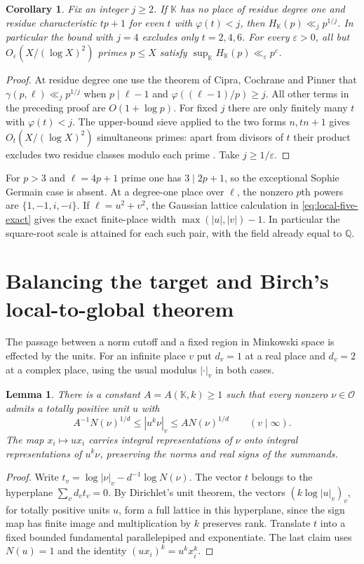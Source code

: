 \documentclass[11pt,letterpaper]{article}
\newtheorem{lemma}[lemma]{Lemma}
\newtheorem{corollary}[corollary]{Corollary}
\theoremstyle{definition}
\numberwithin{equation}{section}
\begin{document}
\begin{corollary}\label{cor:prime-degree-density}
Fix an integer $j\ge2$. If $\mathbb K$ has no place of residue degree one and
residue characteristic $tp+1$ for even $t$ with $\varphi(t)<j$,
then $H_{\mathbb K}(p)\ll_j p^{1/j}$. In particular the bound
with $j=4$ excludes only $t=2,4,6$. For every $\varepsilon>0$,
all but $O_\varepsilon(X/(\log X)^2)$ primes $p\le X$ satisfy
$\sup_{\mathbb K}H_{\mathbb K}(p)\ll_\varepsilon p^\varepsilon$.
\end{corollary}
\begin{proof}
At residue degree one use the theorem of Cipra, Cochrane and
Pinner \cite[Theorem~1]{hprimeCCP} that
$\gamma(p,\ell)\ll_j p^{1/j}$ when $p\mid\ell-1$ and
$\varphi((\ell-1)/p)\ge j$. All other terms in the preceding proof
are $O(1+\log p)$. For fixed $j$ there are only finitely many $t$
with $\varphi(t)<j$. The upper-bound sieve applied to the two forms
$n,tn+1$ gives $O_t(X/(\log X)^2)$ simultaneous primes:
apart from divisors of $t$ their product excludes two residue
classes modulo each prime \cite{hprimeHR}. Take $j\ge1/\varepsilon$.
\end{proof}
For $p>3$ and $\ell=4p+1$ prime one has $3\mid2p+1$, so the
exceptional Sophie Germain case is absent. At a degree-one place
over $\ell$, the nonzero $p$th powers are $\{1,-1,i,-i\}$.
If $\ell=u^2+v^2$, the Gaussian lattice calculation in
\eqref{eq:local-five-exact} gives the exact finite-place width
$\max(|u|,|v|)-1$. In particular the square-root scale is attained
for each such pair, with the field already equal to $\mathbb Q$.

\section{Balancing the target and Birch's local-to-global theorem}\label{sec:hbirch}
The passage between a norm cutoff and a fixed region in Minkowski
space is effected by the units. For an infinite place $v$ put $d_v=1$
at a real place and $d_v=2$ at a complex place, using the usual modulus
$|\cdot|_v$ in both cases.

\begin{lemma}\label{lem:hbal}
There is a constant $A=A(\mathbb K,k)\ge1$ such that every nonzero
$\nu\in\mathcal O$ admits a totally positive unit $u$ with
\[
 A^{-1}N(\nu)^{1/d}\le |u^k\nu|_v\le A N(\nu)^{1/d}
                  \qquad(v\mid\infty).
\]
The map $x_i\mapsto ux_i$ carries integral representations of $\nu$
onto integral representations of $u^k\nu$, preserving the norms and
real signs of the summands.
\end{lemma}
\begin{proof}
Write $t_v=\log|\nu|_v-d^{-1}\log N(\nu)$. The vector $t$ belongs to
the hyperplane $\sum_v d_v t_v=0$. By Dirichlet's unit theorem, the
vectors $(k\log|u|_v)_v$, for totally positive units $u$, form a full
lattice in this hyperplane, since the sign map has finite image and
multiplication by $k$ preserves rank. Translate $t$ into a fixed
bounded fundamental parallelepiped and exponentiate. The last claim
uses $N(u)=1$ and the identity $(ux_i)^k=u^kx_i^k$.
\end{proof}
\end{document}
